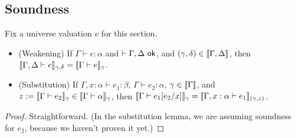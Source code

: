 \subsection{Soundness}
Fix a universe valuation $v$ for this section.
\begin{lemma}[Basics]
\begin{itemize}
\item (Weakening) If $\Gamma\vdash e:\alpha$ and $\vdash\Gamma,\Delta\ok$, and $(\gamma,\delta)\in\scott{\Gamma,\Delta}$, then $\scott{\Gamma,\Delta\vdash e}_{\gamma,\delta}=\scott{\Gamma\vdash e}_\gamma$.
\item (Substitution) If $\Gamma,x:\alpha\vdash e_1:\beta$, $\Gamma\vdash e_2:\alpha$, $\gamma\in\scott{\Gamma}$, and $z:=\scott{\Gamma\vdash e_2}_\gamma\in\scott{\Gamma\vdash\alpha}_\gamma$, then $\scott{\Gamma\vdash e_1[e_2/x]}_\gamma=\scott{\Gamma,x:\alpha\vdash e_1}_{(\gamma,z)}$.
\end{itemize}
\end{lemma}
\begin{proof}
Straightforward. (In the substitution lemma, we are assuming soundness for $e_2$, because we haven't proven it yet.)
\end{proof}

